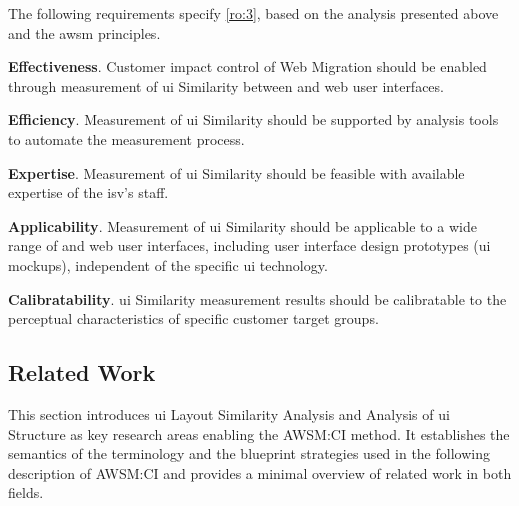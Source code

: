The following requirements specify \cref{ro:3}, based on the analysis presented above and the \gls{awsm} principles.

\vspace{-10pt}
\textbf{Effectiveness}. Customer impact control of \gls{Web Migration} should be enabled through measurement of \gls{ui} Similarity between  and \gls{web} user interfaces.

\vspace{-10pt}
\textbf{Efficiency}. Measurement of \gls{ui} Similarity should be supported by analysis tools to automate the measurement process.

\vspace{-10pt}
\textbf{Expertise}. Measurement of \gls{ui} Similarity should be feasible with available expertise of the \gls{isv}'s staff.

\vspace{-10pt}
\textbf{Applicability}. Measurement of \gls{ui} Similarity should be applicable to a wide range of  and \gls{web} user interfaces, including user interface design prototypes (\gls{ui} mockups), independent of the specific \gls{ui} technology.

\vspace{-10pt}
\textbf{Calibratability}. \gls{ui} Similarity measurement results should be calibratable to the perceptual characteristics of specific customer target groups.

\vspace{-42pt}
\hypertarget{sec:ci.related-work}{%
\subsection{Related Work}\label{sec:ci.related-work}}
\vspace{7pt}

This section introduces \gls{ui} Layout Similarity Analysis and Analysis of \gls{ui} Structure as key research areas enabling the AWSM:CI method.
It establishes the semantics of the terminology and the blueprint strategies used in the following description of AWSM:CI and provides a minimal overview of related work in both fields.

